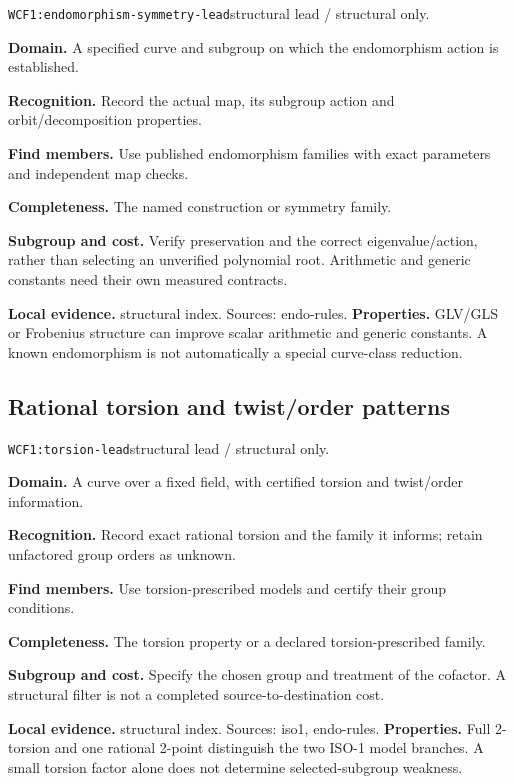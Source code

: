 \documentclass[10pt]{article}
\begin{document}
\texttt{WCF1:endomorphism-symmetry-lead}\quad structural lead / structural only.\par
\textbf{Domain.} A specified curve and subgroup on which the endomorphism action is established.\par
\textbf{Recognition.} Record the actual map, its subgroup action and orbit/decomposition properties.\par
\textbf{Find members.} Use published endomorphism families with exact parameters and independent map checks.\par
\textbf{Completeness.} The named construction or symmetry family.\par
\textbf{Subgroup and cost.} Verify preservation and the correct eigenvalue/action, rather than selecting an unverified polynomial root. Arithmetic and generic constants need their own measured contracts.\par
\textbf{Local evidence.} structural index. Sources: endo-rules.
\textbf{Properties.} GLV/GLS or Frobenius structure can improve scalar arithmetic and generic constants. A known endomorphism is not automatically a special curve-class reduction.\par
{}\subsection{Rational torsion and twist/order patterns}
\texttt{WCF1:torsion-lead}\quad structural lead / structural only.\par
\textbf{Domain.} A curve over a fixed field, with certified torsion and twist/order information.\par
\textbf{Recognition.} Record exact rational torsion and the family it informs; retain unfactored group orders as unknown.\par
\textbf{Find members.} Use torsion-prescribed models and certify their group conditions.\par
\textbf{Completeness.} The torsion property or a declared torsion-prescribed family.\par
\textbf{Subgroup and cost.} Specify the chosen group and treatment of the cofactor. A structural filter is not a completed source-to-destination cost.\par
\textbf{Local evidence.} structural index. Sources: iso1, endo-rules.
\textbf{Properties.} Full 2-torsion and one rational 2-point distinguish the two ISO-1 model branches. A small torsion factor alone does not determine selected-subgroup weakness.\par
\end{document}
